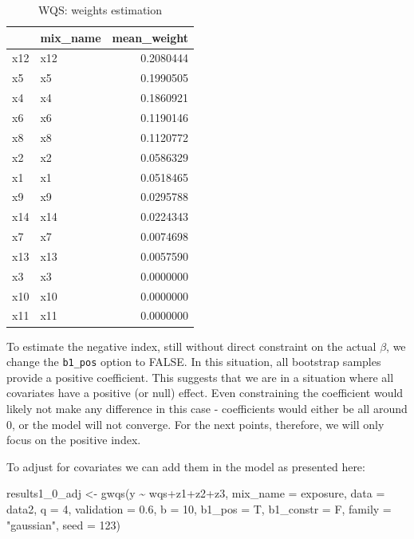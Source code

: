 \documentclass[
]{book}
\newenvironment{Shaded}{\begin{snugshade}}{\end{snugshade}}
\newcommand{\AttributeTok}[1]{\textcolor[rgb]{0.77,0.63,0.00}{#1}}
\newcommand{\DecValTok}[1]{\textcolor[rgb]{0.00,0.00,0.81}{#1}}
\newcommand{\FloatTok}[1]{\textcolor[rgb]{0.00,0.00,0.81}{#1}}
\newcommand{\FunctionTok}[1]{\textcolor[rgb]{0.00,0.00,0.00}{#1}}
\newcommand{\NormalTok}[1]{#1}
\newcommand{\OtherTok}[1]{\textcolor[rgb]{0.56,0.35,0.01}{#1}}
\newcommand{\SpecialCharTok}[1]{\textcolor[rgb]{0.00,0.00,0.00}{#1}}
\newcommand{\StringTok}[1]{\textcolor[rgb]{0.31,0.60,0.02}{#1}}
\begin{document}
\begin{table}

\caption{\label{tab:unnamed-chunk-22}WQS: weights estimation}
\centering
\begin{tabular}[t]{l|l|r}
\hline
  & mix\_name & mean\_weight\\
\hline
x12 & x12 & 0.2080444\\
\hline
x5 & x5 & 0.1990505\\
\hline
x4 & x4 & 0.1860921\\
\hline
x6 & x6 & 0.1190146\\
\hline
x8 & x8 & 0.1120772\\
\hline
x2 & x2 & 0.0586329\\
\hline
x1 & x1 & 0.0518465\\
\hline
x9 & x9 & 0.0295788\\
\hline
x14 & x14 & 0.0224343\\
\hline
x7 & x7 & 0.0074698\\
\hline
x13 & x13 & 0.0057590\\
\hline
x3 & x3 & 0.0000000\\
\hline
x10 & x10 & 0.0000000\\
\hline
x11 & x11 & 0.0000000\\
\hline
\end{tabular}
\end{table}

To estimate the negative index, still without direct constraint on the actual \(\beta\), we change the \texttt{b1\_pos} option to FALSE. In this situation, all bootstrap samples provide a positive coefficient. This suggests that we are in a situation where all covariates have a positive (or null) effect. Even constraining the coefficient would likely not make any difference in this case - coefficients would either be all around 0, or the model will not converge. For the next points, therefore, we will only focus on the positive index.

To adjust for covariates we can add them in the model as presented here:

\begin{Shaded}
\begin{Highlighting}[]
\NormalTok{results1\_0\_adj }\OtherTok{\textless{}{-}} \FunctionTok{gwqs}\NormalTok{(y }\SpecialCharTok{\textasciitilde{}}\NormalTok{ wqs}\SpecialCharTok{+}\NormalTok{z1}\SpecialCharTok{+}\NormalTok{z2}\SpecialCharTok{+}\NormalTok{z3, }\AttributeTok{mix\_name =}\NormalTok{ exposure, }\AttributeTok{data =}\NormalTok{ data2, }\AttributeTok{q =} \DecValTok{4}\NormalTok{, }\AttributeTok{validation =} \FloatTok{0.6}\NormalTok{,}
                \AttributeTok{b =} \DecValTok{10}\NormalTok{, }\AttributeTok{b1\_pos =}\NormalTok{ T, }\AttributeTok{b1\_constr =}\NormalTok{ F, }\AttributeTok{family =} \StringTok{"gaussian"}\NormalTok{, }
                \AttributeTok{seed =} \DecValTok{123}\NormalTok{)}
\end{Highlighting}
\end{Shaded}
\end{document}
